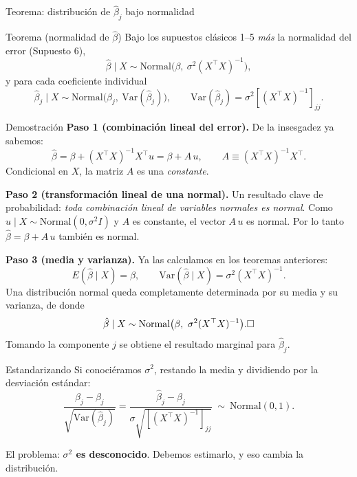 \documentclass{beamer}
\begin{document}
\begin{frame}[allowframebreaks]{Teorema: distribución de $\hat{\beta}_j$ bajo normalidad}

\begin{alertblock}{Teorema (normalidad de $\hat{\beta}$)}
Bajo los supuestos clásicos 1--5 \emph{más} la normalidad del error (Supuesto 6),
\[
\hat{\beta}\mid X \sim \text{Normal}\big(\beta,\ \sigma^2(X^{\top}X)^{-1}\big),
\]
y para cada coeficiente individual
\[
\hat{\beta}_j \mid X \sim \text{Normal}\big(\beta_j,\ \text{Var}(\hat{\beta}_j)\big),
\qquad \text{Var}(\hat{\beta}_j)=\sigma^2[(X^{\top}X)^{-1}]_{jj}.
\]
\end{alertblock}

\begin{exampleblock}{Demostración}
\textbf{Paso 1 (combinación lineal del error).} De la insesgadez ya sabemos:
\[
\hat{\beta} = \beta + (X^{\top}X)^{-1}X^{\top}u = \beta + A\,u,
\qquad A \equiv (X^{\top}X)^{-1}X^{\top}.
\]
Condicional en $X$, la matriz $A$ es una \emph{constante}.

\medskip
\textbf{Paso 2 (transformación lineal de una normal).} Un resultado clave de probabilidad: \emph{toda combinación lineal de variables normales es normal}. Como $u\mid X \sim \text{Normal}(0,\sigma^2 I)$ y $A$ es constante, el vector $A\,u$ es normal. Por lo tanto $\hat{\beta}=\beta + A\,u$ también es normal.

\medskip
\textbf{Paso 3 (media y varianza).} Ya las calculamos en los teoremas anteriores:
\[
E(\hat{\beta}\mid X)=\beta, \qquad \text{Var}(\hat{\beta}\mid X)=\sigma^2(X^{\top}X)^{-1}.
\]
Una distribución normal queda completamente determinada por su media y su varianza, de donde
\[
\hat{\beta}\mid X \sim \text{Normal}\big(\beta,\ \sigma^2(X^{\top}X)^{-1}\big). \hfill \square
\]
Tomando la componente $j$ se obtiene el resultado marginal para $\hat{\beta}_j$.
\end{exampleblock}

\framebreak

\begin{block}{Estandarizando}
Si conociéramos $\sigma^2$, restando la media y dividiendo por la desviación estándar:
\[
\frac{\hat{\beta}_j - \beta_j}{\sqrt{\text{Var}(\hat{\beta}_j)}}
= \frac{\hat{\beta}_j - \beta_j}{\sigma\sqrt{[(X^{\top}X)^{-1}]_{jj}}}
\ \sim\ \text{Normal}(0,1).
\]
\end{block}
El problema: \textbf{$\sigma^2$ es desconocido}. Debemos estimarlo, y eso cambia la distribución.
\end{frame}
\end{document}
